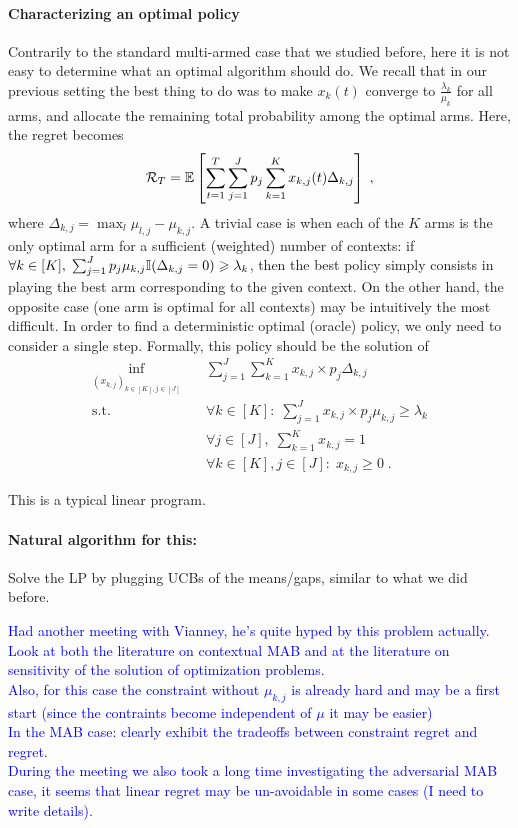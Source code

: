 \paragraph{Characterizing an optimal policy} Contrarily to the standard multi-armed case that we studied before, here it is not easy to determine what an optimal algorithm should do. We recall that in our previous setting the best thing to do was to make $x_k(t)$ converge to $\frac{\lambda_k}{\mu_k}$ for all arms, and allocate the remaining total probability among the optimal arms. Here, the regret becomes 
\[\mathcal{R}_T = \mathbb{E}\left[\sum_{t=1}^T \sum_{j=1}^J p_j \sum_{k=1}^K x_{k,j}(t)\Delta_{k,j}\right]\;, \]
where $\Delta_{k, j}=\max_{l} \mu_{l, j} - \mu_{k,j}$. A trivial case is when each of the $K$ arms is the only optimal arm for a sufficient (weighted) number of contexts: if $\forall k \in [K], \;\sum_{j=1}^J p_j \mu_{k,j} \mathbb{I}(\Delta_{k,j}=0)\geqslant \lambda_k$, then the best policy simply consists in playing the best arm corresponding to the given context. On the other hand, the opposite case (one arm is optimal for all contexts) may be intuitively the most difficult. In order to find a deterministic optimal (oracle) policy, we only need to consider a single step. Formally, this policy should be the solution of 
\begin{align*}
\inf_{(x_{k,j})_{k \in [K], j \in [J]}} \quad & \sum_{j=1}^J  \sum_{k=1}^K x_{k,j}\times  p_j\Delta_{k, j}\\
\textrm{s.t.} \quad & \forall k \in [K]: \; \sum_{j=1}^J x_{k,j} \times p_j \mu_{k, j} \geq \lambda_k\\
& \forall j \in [J], \; \sum_{k=1}^K x_{k,j} =1 \\
& \forall k \in [K], j \in [J]: \; x_{k,j} \geq 0 \;.
\end{align*}

This is a typical linear program.

\paragraph{Natural algorithm for this:} Solve the LP by plugging UCBs of the means/gaps, similar to what we did before.

\textcolor{blue}{Had another meeting with Vianney, he's quite hyped by this problem actually. Look at both the literature on contextual MAB and at the literature on sensitivity of the solution of optimization problems.\\
Also, for this case the constraint without $\mu_{k,j}$ is already hard and may be a first start (since the contraints become independent of $\mu$ it may be easier)\\
In the MAB case: clearly exhibit the tradeoffs between constraint regret and regret.\\
During the meeting we also took a long time investigating the adversarial MAB case, it seems that linear regret may be un-avoidable in some cases (I need to write details).}
